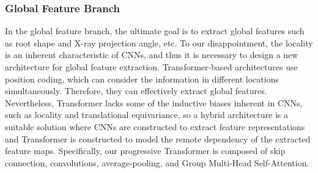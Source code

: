 \documentclass[journal]{IEEEtran}
\begin{document}
\subsubsection{Global Feature Branch}
In the global feature branch, the ultimate goal is to extract global features such as root shape and X-ray projection angle, etc. To our disappointment, the locality is an inherent characteristic of CNNs, and thus it is necessary to design a new architecture for global feature extraction. Transformer-based architectures use position coding, which can consider the information in different locations simultaneously. Therefore, they can effectively extract global features. Nevertheless, Transformer lacks some of the inductive biases inherent in CNNs, such as locality and translational equivariance, so a hybrid architecture is a suitable solution where CNNs are constructed to extract feature representations and Transformer is constructed to model the remote dependency of the extracted feature maps. Specifically, our progressive Transformer is composed of skip connection, convolutions, average-pooling, and Group Multi-Head Self-Attention.
\end{document}
